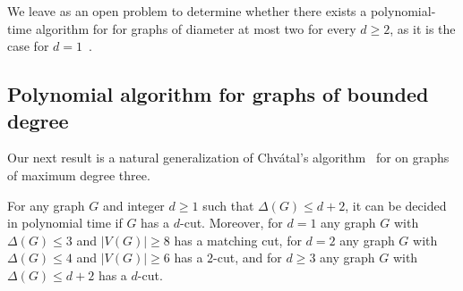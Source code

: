 We leave as an open problem to determine whether there exists a  polynomial-time algorithm for  for graphs of diameter at most two for every $d \geq 2$, as it is the case for $d=1$~\cite{matching_cut_diameter}.




\subsection{Polynomial algorithm for graphs of bounded degree}
\label{sec:poly-algo}


Our next result is a natural generalization of Chvátal's algorithm~\cite{chvatal_matching_cut} for  on graphs of maximum degree three.

\begin{theorem}
    \label{thm:small_deg_poly}
    For any graph $G$ and integer $d \geq 1$ such that $\Delta(G) \leq d+2$, it can be decided in polynomial time if $G$ has a $d$-cut. Moreover, for $d=1$ any graph $G$ with $\Delta(G) \leq 3$ and $|V(G)| \geq 8$ has a matching cut, for $d=2$ any graph $G$ with $\Delta(G) \leq 4$ and $|V(G)| \geq 6$ has a $2$-cut, and for $d\geq 3$ any graph $G$ with $\Delta(G) \leq d+2$ has a $d$-cut.
\end{theorem}

